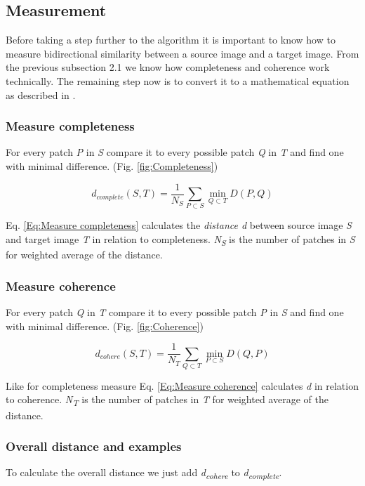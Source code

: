 \subsection{Measurement}
Before taking a step further to the algorithm it is important to know how to measure bidirectional similarity between a source image and a target image. From the previous subsection 2.1 we know how completeness and coherence work technically. The remaining step now is to convert it to a mathematical equation as described in \cite{bisi}.

\subsubsection*{Measure completeness}
For every patch \textit{P} in \textit{S} compare it to every possible patch \textit{Q} in \textit{T} and find one with minimal difference. (Fig. \ref{fig:Completeness})

\large
\begin{equation}
\label{Eq:Measure completeness}
d_{complete}(S,T)=\frac{1}{N_{S}}\sum_{P \subset S} \min\limits_{Q \subset T} D(P,Q)
\end{equation}
\normalsize

Eq. \ref{Eq:Measure completeness} calculates the \textit{distance d} between source image \textit{S} and target image \textit{T} in relation to completeness. \textit{N\textsubscript{S}} is the number of patches in \textit{S} for weighted average of the distance.

\subsubsection*{Measure coherence}
For every patch \textit{Q} in \textit{T} compare it to every possible patch \textit{P} in \textit{S} and find one with minimal difference. (Fig. \ref{fig:Coherence})

\large
\begin{equation}
\label{Eq:Measure coherence}
d_{cohere}(S,T)=\frac{1}{N_{T}}\sum_{Q \subset T} \min\limits_{P \subset S} D(Q,P)
\end{equation}
\normalsize

Like for completeness measure Eq. \ref{Eq:Measure coherence} calculates \textit{d} in relation to coherence. \textit{N\textsubscript{T}} is the number of patches in \textit{T} for weighted average of the distance.

\subsubsection*{Overall distance and examples}
To calculate the overall distance we just add \textit{d\textsubscript{cohere}} to \textit{d\textsubscript{complete}}.

